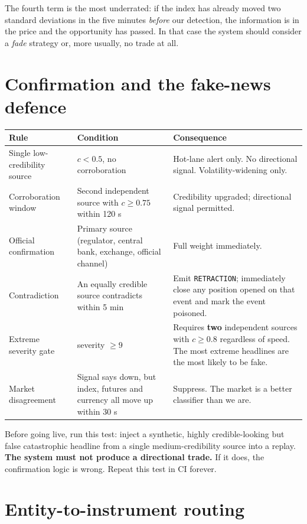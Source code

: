 The fourth term is the most underrated: if the index has already moved two
standard deviations in the five minutes \emph{before} our detection, the
information is in the price and the opportunity has passed. In that case the
system should consider a \emph{fade} strategy or, more usually, no trade at all.

\section{Confirmation and the fake-news defence}

\begin{longtable}{@{}p{3.4cm}p{5.2cm}p{5.8cm}@{}}
\toprule
\textbf{Rule} & \textbf{Condition} & \textbf{Consequence}\\
\midrule
Single low-credibility source & $c < 0.5$, no corroboration & Hot-lane alert
only. No directional signal. Volatility-widening only.\\
Corroboration window & Second independent source with $c \ge 0.75$ within 120 s
& Credibility upgraded; directional signal permitted.\\
Official confirmation & Primary source (regulator, central bank, exchange,
official channel) & Full weight immediately.\\
Contradiction & An equally credible source contradicts within 5 min & Emit
\texttt{RETRACTION}; immediately close any position opened on that event and
mark the event poisoned.\\
Extreme severity gate & severity $\ge 9$ & Requires \textbf{two} independent
sources with $c \ge 0.8$ regardless of speed. The most extreme headlines are the
most likely to be fake.\\
Market disagreement & Signal says down, but index, futures and currency all move
up within 30 s & Suppress. The market is a better classifier than we are.\\
\bottomrule
\end{longtable}

\begin{warnbox}[title={The AP-hack test}]
Before going live, run this test: inject a synthetic, highly credible-looking
but false catastrophic headline from a single medium-credibility source into a
replay. \textbf{The system must not produce a directional trade.} If it does,
the confirmation logic is wrong. Repeat this test in CI forever.
\end{warnbox}

\section{Entity-to-instrument routing}

